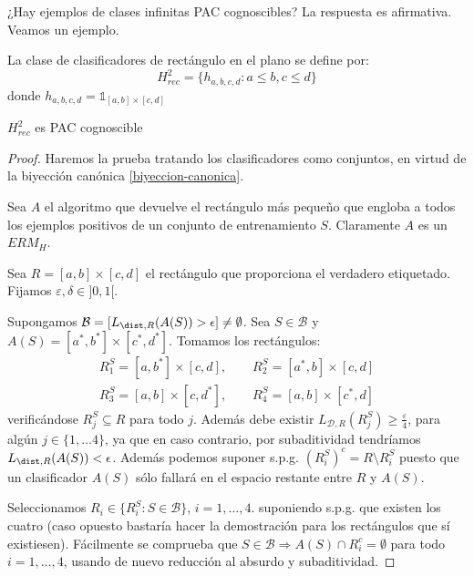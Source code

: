 ¿Hay ejemplos de clases infinitas PAC cognoscibles? La respuesta es afirmativa. Veamos un ejemplo.

\begin{example}
  \begin{definition}
  La clase de clasificadores de rectángulo en el plano se define por:
  \[
    H^2_{rec} = \{ h_{a,b,c,d}: a\le b, c\le d\}
  \]
  donde $h_{a,b,c,d} = \mathds{1}_{[a,b]\times [c,d]}$
  \label{def:rec2}
  \end{definition}
    \begin{fact}
    $H_{rec}^2$ es PAC cognoscible
    \end{fact}

    \begin{proof}
    Haremos la prueba tratando los clasificadores como conjuntos, en virtud de la biyección canónica \ref{biyeccion-canonica}.
    
    Sea $A$ el algoritmo que devuelve el rectángulo más pequeño que engloba a todos los ejemplos positivos de un conjunto 
    de entrenamiento $S$. Claramente $A$ es un $ERM_H$.

    Sea $R= [a,b]\times [c,d]$ el rectángulo que proporciona el verdadero etiquetado. Fijamos $\varepsilon, \delta \in ]0,1[$.
    
    Supongamos $\mathcal{B} = [L_{\dist,R}(A(S)) > \epsilon] \neq \emptyset$. Sea $S\in \mathcal{B}$ y 
    $A(S) = [a^{\ast}, b^{\ast}] \times [c^{\ast}, d^{\ast}]$. Tomamos los rectángulos:
    \begin{align*} 
    R_1^S = [a,b^{\ast}] \times [c,d], \qquad R_2^S = [a^{\ast},b] \times [c,d] \\ 
    R_3^S =[a,b] \times [c,d^{\ast}],   \qquad R_4^S = [a,b] \times [c^{\ast},d]     
    \end{align*}
    verificándose $R_j^S \subseteq R$ para todo $j$. Además debe existir $L_{\mathcal{D},R}(R_j^S) \ge \frac{\varepsilon}{4}$, 
    para algún $j\in \{1, \ldots 4\}$, ya que en caso contrario, por subaditividad tendríamos $L_{\dist,R}(A(S)) < \epsilon$. 
    Además podemos suponer s.p.g. $(R_i^S)^c = R\setminus R_i^S$ puesto que un clasificador $A(S)$ sólo fallará en el
    espacio restante entre $R$ y $A(S)$.
    
    Seleccionamos $R_i \in \{R_i^S: S\in \mathcal{B}\}$, $i=1, \ldots, 4$. suponiendo s.p.g. que existen los cuatro (caso opuesto 
    bastaría hacer la demostración para los rectángulos que sí existiesen). Fácilmente se comprueba que 
    $S\in \mathcal{B} \Rightarrow A(S) \cap R_i^c = \emptyset$ para todo $i=1, \ldots, 4$, usando de nuevo reducción al 
    absurdo y subaditividad.
    

\end{proof}
\end{example}
